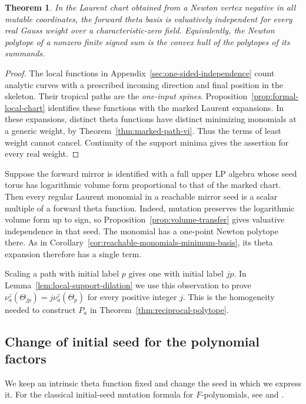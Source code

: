 \documentclass[11pt,reqno]{amsart}
\numberwithin{equation}{section}
\newtheorem{theorem}{Theorem}[section]
\theoremstyle{definition}
\theoremstyle{remark}
\begin{document}
\begin{theorem}\label{thm:forward-vi-main}
In the Laurent chart obtained from a Newton vertex negative in
all mutable coordinates, the forward theta basis is valuatively
independent for every real Gauss weight over a characteristic-zero
field. Equivalently, the Newton polytope of a nonzero finite signed
sum is the convex hull of the polytopes of its summands.
\end{theorem}
\begin{proof}
The local functions in Appendix~\ref{sec:one-sided-independence} count
analytic curves with a prescribed incoming direction and final position
in the skeleton. Their tropical paths are the \emph{one-input spines}.
Proposition~\ref{prop:formal-local-chart} identifies these functions
with the marked Laurent expansions. In these
expansions, distinct theta functions have distinct minimizing monomials
at a generic weight, by Theorem~\ref{thm:marked-path-vi}. Thus the
terms of least weight cannot cancel. Continuity of the support minima
gives the assertion for every real weight.
\end{proof}

Suppose the forward mirror is identified with a full upper LP algebra
whose seed torus has logarithmic volume form proportional to that of
the marked chart. Then every regular Laurent monomial in a reachable
mirror seed is a scalar multiple of a forward theta function. Indeed,
mutation preserves the logarithmic volume form up to sign, so
Proposition~\ref{prop:volume-transfer} gives valuative independence in
that seed. The monomial has a one-point Newton polytope there. As in
Corollary~\ref{cor:reachable-monomials-minimum-basis}, its theta
expansion therefore has a single term.

Scaling a path with initial label \(p\) gives one with initial label \(jp\).
In Lemma~\ref{lem:local-support-dilation} we use this observation to prove
\(\nu^z_a(\Theta_{jp})=j\nu^z_a(\Theta_p)\) for every positive integer \(j\).
This is the homogeneity needed to construct \(P_a\) in
Theorem~\ref{thm:reciprocal-polytope}.

\subsection{Change of initial seed for the polynomial factors}

We keep an intrinsic theta function fixed and change the seed in which
we express it. For the classical initial-seed mutation formula for
\(F\)-polynomials, see \cite[(6.21)]{FZIV}
and \cite[Proposition~3.4]{FuGy}.
\end{document}
